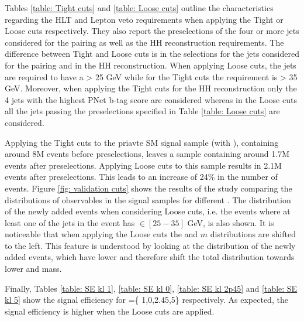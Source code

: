 Tables \ref{table: Tight cuts} and \ref{table: Loose cuts} outline the characteristics regarding the HLT and Lepton veto requirements when applying the Tight or Loose cuts respectively. They also report the preselections of the four or more jets considered for the pairing as well as the HH reconstruction requirements. The difference between Tight and Loose cuts is in the selections for the jets considered for the pairing and in the HH reconstruction. When applying Loose cuts, the jets are required to have a \pt > 25 GeV while for the Tight cuts the requirement is \pt > 35 GeV. Moreover, when applying the Tight cuts for the HH reconstruction only the 4 jets with the highest PNet b-tag score are considered whereas in the Loose cuts all the jets passing the preselections specified in Table \ref{table: Loose cuts} are considered. 

Applying the Tight cuts to the priavte SM signal sample (with ), containing around 8M events before preselections, leaves a sample containing around 1.7M events after preselections. Applying Loose cuts to this sample results in 2.1M events after preselections. This leads to an increase of 24\% in the number of events. Figure \ref{fig: validation cuts} shows the results of the study comparing the distributions of observables in the signal samples for different \kl. The distribution of the newly added events when considering Loose cuts, i.e. the events where at least one of the jets in the event has \pt $\in [25-35]$ GeV, is also shown. It is noticeable that when applying the Loose cuts the \pt and $m$ distributions are shifted to the left. This feature is understood by looking at the distribution of the newly added events, which have lower \pt and therefore shift the total distribution towards lower \pt and mass.

Finally, Tables \ref{table: SE kl 1}, \ref{table: SE kl 0}, \ref{table: SE kl 2p45} and \ref{table: SE kl 5} show the signal efficiency for \kl=\{ 1,0,2.45,5\} respectively. As expected, the signal efficiency is higher when the Loose cuts are applied.

